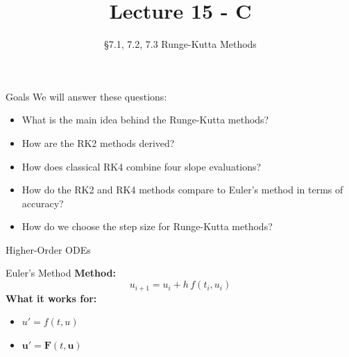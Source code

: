 \documentclass[10pt]{beamer}
\title[Math/CS 375]{Lecture 15 - C}
\subtitle{\S 7.1, 7.2, 7.3 Runge-Kutta Methods}
\begin{document}
\begin{frame}
  \titlepage
\end{frame}
\begin{frame}{Goals}
We will answer these questions:\\[3mm]
\begin{itemize}
    
    \item What is the main idea behind the Runge-Kutta methods?

    \item How are the RK2 methods derived?
    
    \item How does classical RK4 combine four slope evaluations?
    
    \item How do the RK2 and RK4 methods compare to Euler's method in terms of accuracy? 
    
    \item How do we choose the step size for Runge-Kutta methods?
\end{itemize}
\end{frame}





\begin{frame}{Higher-Order ODEs}


\begin{block}{Euler's Method}
\textbf{Method:}
$$
    u_{i+1} = u_i+h\,f(t_i,u_i)
$$
\textbf{What it works for:}
\begin{itemize}
    \item $u'=f(t,u)$
    \item $\textbf{u}'=\textbf{F}(t,\textbf{u})$
\end{itemize}
\end{block}

\end{frame}
\end{document}
